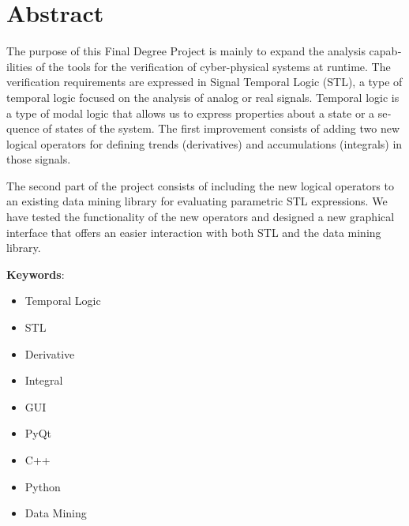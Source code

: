 \section*{Abstract}
\begin{otherlanguage}{british}
The purpose of this Final Degree Project is mainly to expand the analysis capabilities of the tools for the verification of cyber-physical systems at runtime. The verification requirements are expressed in Signal Temporal Logic (STL), a type of temporal logic focused on the analysis of analog or real signals. Temporal logic is a type of modal logic that allows us to express properties about a state or a sequence of states of the system. The first improvement consists of adding two new logical operators for defining trends (derivatives) and accumulations (integrals) in those signals.

The second part of the project consists of including the new logical operators to an existing data mining library for evaluating parametric STL expressions. We have tested the functionality of the new operators and designed a new graphical interface that offers an easier interaction with both STL and the data mining library.

\textbf{Keywords}:
\begin{itemize}
\item Temporal Logic
\item STL
\item Derivative
\item Integral
\item GUI
\item PyQt
\item C++
\item Python
\item Data Mining
\end{itemize}
\end{otherlanguage}